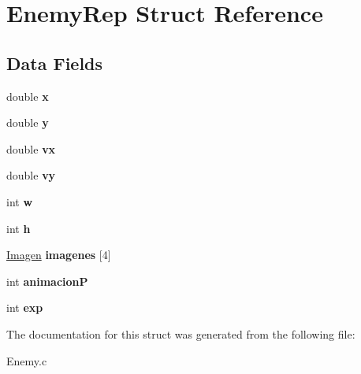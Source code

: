 \hypertarget{struct_enemy_rep}{}\section{Enemy\+Rep Struct Reference}
\label{struct_enemy_rep}
\subsection*{Data Fields}
\begin{DoxyCompactItemize}
\item 
\mbox{\label{struct_enemy_rep_a20842bf8ad949965dd7e96bd7b2087ac}} 
double {\bfseries x}
\item 
\mbox{\label{struct_enemy_rep_a9efcf7de125c73d11688035d1207fab6}} 
double {\bfseries y}
\item 
\mbox{\label{struct_enemy_rep_a65fe7c7125182b5b747a62fbd197abf7}} 
double {\bfseries vx}
\item 
\mbox{\label{struct_enemy_rep_aa053a49c6b8f66b5cd43a5e0d8a5e6ec}} 
double {\bfseries vy}
\item 
\mbox{\label{struct_enemy_rep_a9fac73c950d4edd474320348ec1f8b38}} 
int {\bfseries w}
\item 
\mbox{\label{struct_enemy_rep_a2ff34c9831ca87da56dca4623f5686ea}} 
int {\bfseries h}
\item 
\mbox{\label{struct_enemy_rep_a3282691afa132afa6af04d4486445392}} 
\mbox{\hyperlink{_pantalla_8h_a768e3409329f2389c63495f1a1684379}{Imagen}} {\bfseries imagenes} \mbox{[}4\mbox{]}
\item 
\mbox{\label{struct_enemy_rep_a34f9f6469dfa82087d5904710b0d9d3a}} 
int {\bfseries animacionP}
\item 
\mbox{\label{struct_enemy_rep_aeca539c029ef010fe94ebb13d2990699}} 
int {\bfseries exp}
\end{DoxyCompactItemize}


The documentation for this struct was generated from the following file\+:\begin{DoxyCompactItemize}
\item 
Enemy.\+c\end{DoxyCompactItemize}

